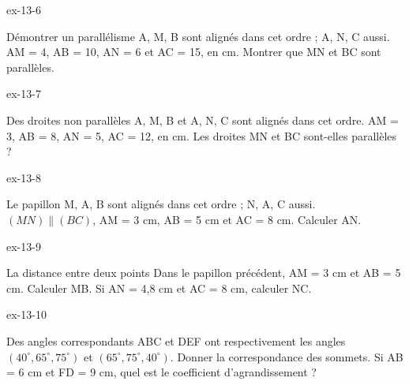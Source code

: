 \clearpage{}
\begin{blocLivre}{ex-13-6}\begin{exercice}[2]{Démontrer un parallélisme}
A, M, B sont alignés dans cet ordre ; A, N, C aussi. AM = 4, AB = 10, AN = 6 et AC = 15, en cm. Montrer que MN et BC sont parallèles.
\label{fig-ex-13-6}
\end{exercice}\end{blocLivre}
\begin{blocLivre}{ex-13-7}\begin{exercice}[2]{Des droites non parallèles}
A, M, B et A, N, C sont alignés dans cet ordre. AM = 3, AB = 8, AN = 5, AC = 12, en cm. Les droites MN et BC sont-elles parallèles ?
\label{fig-ex-13-7}
\end{exercice}\end{blocLivre}
\begin{blocLivre}{ex-13-8}\begin{exercice}[2]{Le papillon}
M, A, B sont alignés dans cet ordre ; N, A, C aussi. $(MN)\parallel(BC)$, AM = 3 cm, AB = 5 cm et AC = 8 cm. Calculer AN.
\label{fig-ex-13-8}
\end{exercice}\end{blocLivre}
\begin{blocLivre}{ex-13-9}\begin{exercice}[2]{La distance entre deux points}
Dans le papillon précédent, AM = 3 cm et AB = 5 cm. Calculer MB. Si AN = 4,8 cm et AC = 8 cm, calculer NC.
\label{fig-ex-13-9}
\end{exercice}\end{blocLivre}
\begin{blocLivre}{ex-13-10}\begin{exercice}[2]{Des angles correspondants}
ABC et DEF ont respectivement les angles $(40^\circ,65^\circ,75^\circ)$ et $(65^\circ,75^\circ,40^\circ)$. Donner la correspondance des sommets. Si AB = 6 cm et FD = 9 cm, quel est le coefficient d’agrandissement ?
\label{fig-ex-13-10}
\end{exercice}\end{blocLivre}


